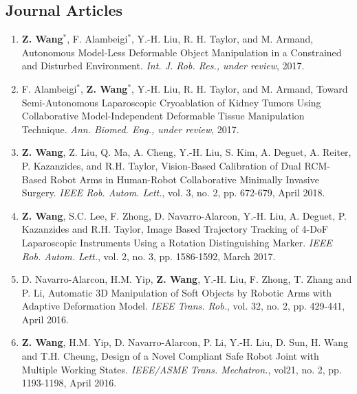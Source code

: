 \documentclass[10pt,letterpaper]{article}
\begin{document}
\subsection*{Journal Articles}
\begin{enumerate}
    \item \textbf{Z. Wang}$^*$, F. Alambeigi$^*$, Y.-H. Liu, R. H. Taylor, and M. Armand,
    Autonomous Model-Less Deformable Object Manipulation in a Constrained and Disturbed Environment.
    \textit{Int. J. Rob. Res., under review}, 2017.
    \item F. Alambeigi$^*$, \textbf{Z. Wang}$^*$, Y.-H. Liu, R. H. Taylor, and M. Armand,
    Toward Semi-Autonomous Laparoscopic Cryoablation of Kidney Tumors Using Collaborative Model-Independent Deformable Tissue Manipulation Technique.
    \textit{Ann. Biomed. Eng., under review}, 2017.
    \item \textbf{Z. Wang}, Z. Liu, Q. Ma, A. Cheng, Y.-H. Liu, S. Kim, A. Deguet, A. Reiter, P. Kazanzides, and R.H. Taylor,
    Vision-Based Calibration of Dual RCM-Based Robot Arms in Human-Robot Collaborative Minimally Invasive Surgery.
    \textit{IEEE Rob. Autom. Lett.}, vol. 3, no. 2, pp. 672-679, April 2018.
    \item \textbf{Z. Wang}, S.C. Lee, F. Zhong, D. Navarro-Alarcon, Y.-H. Liu, A. Deguet, P. Kazanzides and R.H. Taylor,
    Image Based Trajectory Tracking of 4-DoF Laparoscopic Instruments Using a Rotation Distinguishing Marker.
    \textit{IEEE Rob. Autom. Lett.}, vol. 2, no. 3, pp. 1586-1592, March 2017.
    \item D. Navarro-Alarcon, H.M. Yip, \textbf{Z. Wang}, Y.-H. Liu, F. Zhong, T. Zhang and P. Li,
    Automatic 3D Manipulation of Soft Objects by Robotic Arms with Adaptive Deformation Model.
    \textit{{IEEE} Trans. Rob.}, vol. 32, no. 2, pp. 429-441, April 2016.
    \item \textbf{Z. Wang}, H.M. Yip, D. Navarro-Alarcon, P. Li, Y.-H. Liu, D. Sun, H. Wang and T.H. Cheung,
    Design of a Novel Compliant Safe Robot Joint with Multiple Working States.
    \textit{{IEEE/ASME} Trans. Mechatron.}, vol21, no. 2, pp. 1193-1198, April 2016.
\end{enumerate}
\end{document}
